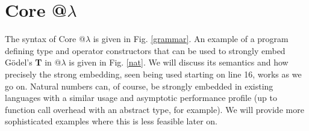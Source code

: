 \documentclass[9pt,preprint]{sigplanconf}
\begin{document}
\section{Core @$\lambda$}\label{core}

%

The syntax of Core @$\lambda$ is given in Fig. \ref{grammar}. An example of a program defining type and operator constructors that can be used to strongly embed G\"odel's \textbf{T} in @$\lambda$ is given in Fig. \ref{nat}. We will discuss its semantics and how precisely the strong embedding, seen being used starting on line 16, works as we go on. Natural numbers can, of course, be strongly embedded in existing languages with a similar usage and asymptotic performance profile (up to function call overhead with an abstract type, for example). We will provide more sophisticated examples where this is less feasible later on. %
\end{document}
